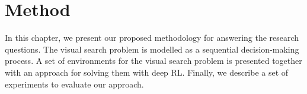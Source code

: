 \chapter{Method}
\label{cha:method}

In this chapter, we present our proposed methodology for answering the research questions.
The visual search problem is modelled as a sequential decision-making process.
A set of environments for the visual search problem is presented together with an approach for solving them with deep RL.
Finally, we describe a set of experiments to evaluate our approach.





